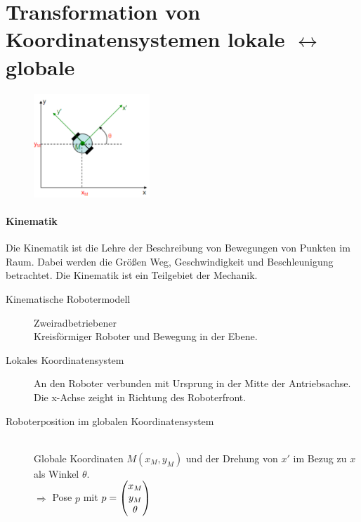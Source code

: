 \section{
	Transformation von Koordinatensystemen lokale $\leftrightarrow$ globale
}

{
\begin{figure}
	\centering
	\includegraphics[width=0.39\textwidth]
		{Resources/PNG/transformationLocalGlobalBsp.png}
	\caption{}
\end{figure}

\paragraph{Kinematik} Die Kinematik ist die Lehre der Beschreibung von
Bewegungen von Punkten im Raum. Dabei werden die Größen Weg, Geschwindigkeit
und Beschleunigung betrachtet. Die Kinematik ist ein Teilgebiet der Mechanik.

\begin{description}
	\item[Kinematische Robotermodell] Zweiradbetriebener \\
		Kreisförmiger Roboter und Bewegung in der Ebene.
	\item[Lokales Koordinatensystem] An den Roboter verbunden mit Ursprung in der
		Mitte der Antriebsachse. Die x-Achse zeight in Richtung des Roboterfront.
	\item[Roboterposition im globalen Koordinatensystem] \hfill \\
		Globale Koordinaten $M(x_M, y_M)$ und der Drehung von $x'$ im Bezug zu $x$
		als Winkel $\theta$. \\
		$\Rightarrow$ Pose $p$ mit $p = \begin{pmatrix}x_M\\y_M\\\theta\end{pmatrix}$

\end{description}

}

